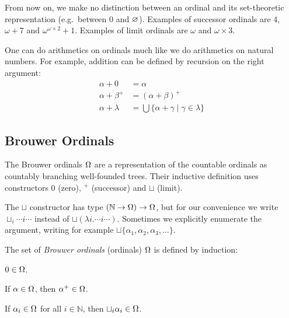 From now on, we make no distinction between an ordinal and its set-theoretic
representation (e.g.\ between $0$ and $\varnothing$). Examples of successor
ordinals are $4$, $\omega + 7$  and $\omega^{\omega \times 2} + 1$. Examples
of limit ordinals are $\omega$ and $\omega \times 3$.


One can do arithmetics on ordinals much like we do arithmetics on natural
numbers. For example, addition can be defined by recursion on the right
argument:
\begin{align*}
  \alpha + 0       &= \alpha\\
  \alpha + \beta^+ &= (\alpha + \beta)^+\\
  \alpha + \lambda &= \bigcup \{ \alpha + \gamma \; | \; \gamma \in \lambda \}
\end{align*}


\subsection{Brouwer Ordinals}\label{sub:brouwer}


The Brouwer ordinals $\Omega$ are a representation of the countable ordinals as
countably branching well-founded trees. Their inductive definition
uses constructors $0$ (zero), $^+$ (successor) and $\sqcup$ (limit).

The $\sqcup$ constructor has type $(\mathbb{N} \rightarrow \Omega) \rightarrow
\Omega$, but for our convenience we write $\sqcup_i \cdots i \cdots$ instead
of $\sqcup (\lambda i . \cdots i \cdots)$. Sometimes we explicitly enumerate
the argument, writing for example $\sqcup \{ \alpha_1, \alpha_2,
\alpha_3, \ldots \}$.

\begin{definition}\label{def:ordinals}%
The set of \emph{Brouwer ordinals} (ordinals) $\Omega$ is defined by
induction:
\begin{compactenum}
  \item
    $0 \in \Omega$.
  \item
    If $\alpha \in \Omega$, then $\alpha^+ \in \Omega$.
  \item
    If $\alpha_i \in \Omega$ for all $i \in \mathbb{N}$, then $\sqcup_i
    \alpha_i \in \Omega$.
\end{compactenum}
\end{definition}

